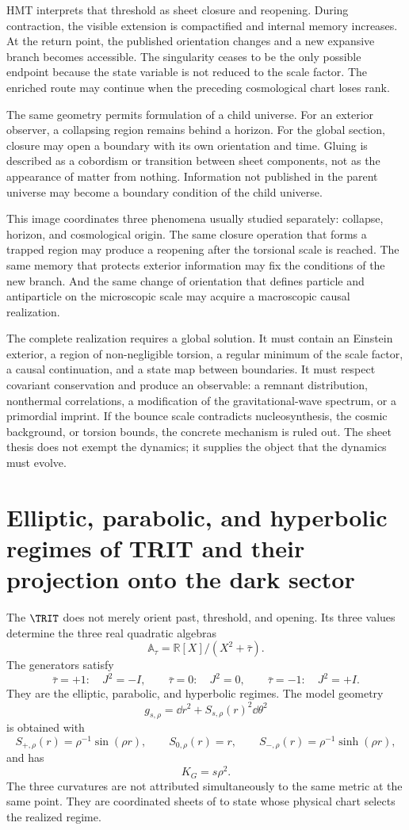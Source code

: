 HMT interprets that threshold as sheet closure and reopening. During contraction,
the visible extension is compactified and internal memory increases. At the
return point, the published orientation changes and a new expansive branch becomes
accessible. The singularity ceases to be the only possible endpoint because the state
variable is not reduced to the scale factor. The enriched route may continue when
the preceding cosmological chart loses rank.

The same geometry permits formulation of a child universe. For an exterior observer,
a collapsing region remains behind a horizon. For the global section, closure
may open a boundary with its own orientation and time. Gluing is described
as a cobordism or transition between sheet components, not as the appearance
of matter from nothing. Information not published in the parent universe
may become a boundary condition of the child universe.

This image coordinates three phenomena usually studied separately: collapse,
horizon, and cosmological origin. The same closure operation that forms a trapped
region may produce a reopening after the torsional scale is reached. The same
memory that protects exterior information may fix the conditions of the new
branch. And the same change of orientation that defines particle and antiparticle on the
microscopic scale may acquire a macroscopic causal realization.

The complete realization requires a global solution. It must contain an Einstein
exterior, a region of non-negligible torsion, a regular minimum of the scale
factor, a causal continuation, and a state map between boundaries. It must respect
covariant conservation and produce an observable: a remnant distribution,
nonthermal correlations, a modification of the gravitational-wave spectrum, or a
primordial imprint. If the bounce scale contradicts nucleosynthesis, the cosmic background, or
torsion bounds, the concrete mechanism is ruled out. The sheet thesis does not
exempt the dynamics; it supplies the object that the dynamics must evolve.

\section{Elliptic, parabolic, and hyperbolic regimes of TRIT and their projection onto the dark sector}

The \(\TRIT\) does not merely orient past, threshold, and opening. Its three values determine
the three real quadratic algebras
\[
 \mathbb A_\tau
 =
 \mathbb R[X]/(X^2+\bar\tau).
\]
The generators satisfy
\[
 \bar\tau=+1:
 \quad J^2=-I,
 \qquad
 \bar\tau=0:
 \quad J^2=0,
 \qquad
 \bar\tau=-1:
 \quad J^2=+I.
\]
They are the elliptic, parabolic, and hyperbolic regimes. The model geometry
\[
 g_{s,\rho}
 =
 \dd r^2+S_{s,\rho}(r)^2\dd\theta^2
\]
is obtained with
\[
 S_{+,\rho}(r)=\rho^{-1}\sin(\rho r),
 \qquad
 S_{0,\rho}(r)=r,
 \qquad
 S_{-,\rho}(r)=\rho^{-1}\sinh(\rho r),
\]
and has
\[
 K_G=s\rho^2.
\]
The three curvatures are not attributed simultaneously to the same metric at the same
point. They are coordinated sheets of to state whose physical chart selects the realized regime.

